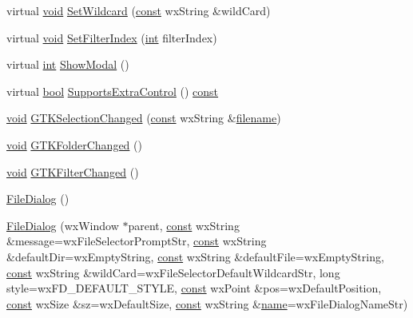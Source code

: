 \begin{DoxyCompactItemize}
virtual \hyperlink{sound_8c_ae35f5844602719cf66324f4de2a658b3}{void} \hyperlink{class_file_dialog_aea3fb21df19e17b31aac1053c1f1ec7e}{Set\+Wildcard} (\hyperlink{getopt1_8c_a2c212835823e3c54a8ab6d95c652660e}{const} wx\+String \&wild\+Card)
\item 
virtual \hyperlink{sound_8c_ae35f5844602719cf66324f4de2a658b3}{void} \hyperlink{class_file_dialog_ab76858e3c52e455d9c3f7e4986a8d19d}{Set\+Filter\+Index} (\hyperlink{xmltok_8h_a5a0d4a5641ce434f1d23533f2b2e6653}{int} filter\+Index)
\item 
virtual \hyperlink{xmltok_8h_a5a0d4a5641ce434f1d23533f2b2e6653}{int} \hyperlink{class_file_dialog_aed3d914162dc51d27750d067f3b420dc}{Show\+Modal} ()
\item 
virtual \hyperlink{mac_2config_2i386_2lib-src_2libsoxr_2soxr-config_8h_abb452686968e48b67397da5f97445f5b}{bool} \hyperlink{class_file_dialog_a10429d55fc0ffd582706fee9b5429dc0}{Supports\+Extra\+Control} () \hyperlink{getopt1_8c_a2c212835823e3c54a8ab6d95c652660e}{const} 
\item 
\hyperlink{sound_8c_ae35f5844602719cf66324f4de2a658b3}{void} \hyperlink{class_file_dialog_a8982d78a63ddb15330b5deafc5cd79f9}{G\+T\+K\+Selection\+Changed} (\hyperlink{getopt1_8c_a2c212835823e3c54a8ab6d95c652660e}{const} wx\+String \&\hyperlink{test__portburn_8cpp_a7efa5e9c7494c7d4586359300221aa5d}{filename})
\item 
\hyperlink{sound_8c_ae35f5844602719cf66324f4de2a658b3}{void} \hyperlink{class_file_dialog_ac7adaf662709914e694b397d7cd203b3}{G\+T\+K\+Folder\+Changed} ()
\item 
\hyperlink{sound_8c_ae35f5844602719cf66324f4de2a658b3}{void} \hyperlink{class_file_dialog_a7b0bbd9c0a1301803a30c6eff2231f01}{G\+T\+K\+Filter\+Changed} ()
\item 
\hyperlink{class_file_dialog_aa83fcb95b06464c2a57dd45ba353d94e}{File\+Dialog} ()
\item 
\hyperlink{class_file_dialog_ace5a468fcd70436281f288509ce13574}{File\+Dialog} (wx\+Window $\ast$parent, \hyperlink{getopt1_8c_a2c212835823e3c54a8ab6d95c652660e}{const} wx\+String \&message=wx\+File\+Selector\+Prompt\+Str, \hyperlink{getopt1_8c_a2c212835823e3c54a8ab6d95c652660e}{const} wx\+String \&default\+Dir=wx\+Empty\+String, \hyperlink{getopt1_8c_a2c212835823e3c54a8ab6d95c652660e}{const} wx\+String \&default\+File=wx\+Empty\+String, \hyperlink{getopt1_8c_a2c212835823e3c54a8ab6d95c652660e}{const} wx\+String \&wild\+Card=wx\+File\+Selector\+Default\+Wildcard\+Str, long style=wx\+F\+D\+\_\+\+D\+E\+F\+A\+U\+L\+T\+\_\+\+S\+T\+Y\+LE, \hyperlink{getopt1_8c_a2c212835823e3c54a8ab6d95c652660e}{const} wx\+Point \&pos=wx\+Default\+Position, \hyperlink{getopt1_8c_a2c212835823e3c54a8ab6d95c652660e}{const} wx\+Size \&sz=wx\+Default\+Size, \hyperlink{getopt1_8c_a2c212835823e3c54a8ab6d95c652660e}{const} wx\+String \&\hyperlink{lib_2expat_8h_a1b49b495b59f9e73205b69ad1a2965b0}{name}=wx\+File\+Dialog\+Name\+Str)

\end{DoxyCompactItemize}
